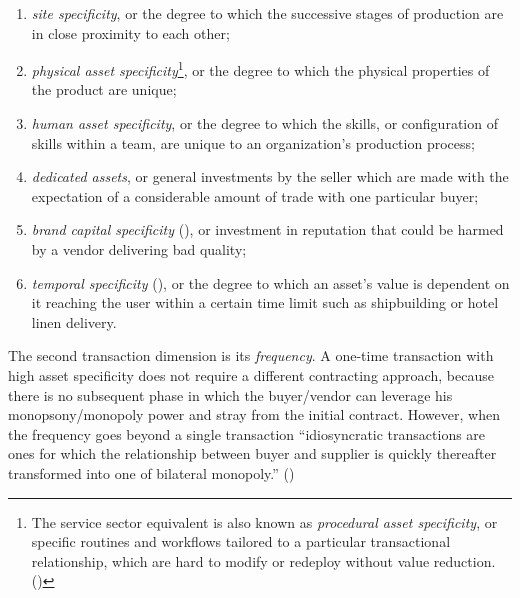 \documentclass[
  man,floatsintext]{apa6}
\providecommand{\tightlist}{%
  \setlength{\itemsep}{0pt}\setlength{\parskip}{0pt}}
\begin{document}
\begin{enumerate}
\def\labelenumi{\arabic{enumi}.}
\tightlist
\item
  \emph{site specificity}, or the degree to which the successive stages of production are in close proximity to each other;
\item
  \emph{physical asset specificity}\footnote{The service sector equivalent is also known as \emph{procedural asset specificity}, or specific routines and workflows tailored to a particular transactional relationship, which are hard to modify or redeploy without value reduction. ()}, or the degree to which the physical properties of the product are unique;
\item
  \emph{human asset specificity}, or the degree to which the skills, or configuration of skills within a team, are unique to an organization's production process;
\item
  \emph{dedicated assets}, or general investments by the seller which are made with the expectation of a considerable amount of trade with one particular buyer;
\item
  \emph{brand capital specificity} (), or investment in reputation that could be harmed by a vendor delivering bad quality;
\item
  \emph{temporal specificity} (), or the degree to which an asset's value is dependent on it reaching the user within a certain time limit such as shipbuilding or hotel linen delivery.
\end{enumerate}

The second transaction dimension is its \emph{frequency}. A one-time transaction with high asset specificity does not require a different contracting approach, because there is no subsequent phase in which the buyer/vendor can leverage his monopsony/monopoly power and stray from the initial contract. However, when the frequency goes beyond a single transaction ``idiosyncratic transactions are ones for which the relationship between buyer and supplier is quickly thereafter transformed into one of bilateral monopoly.'' ()
\end{document}
